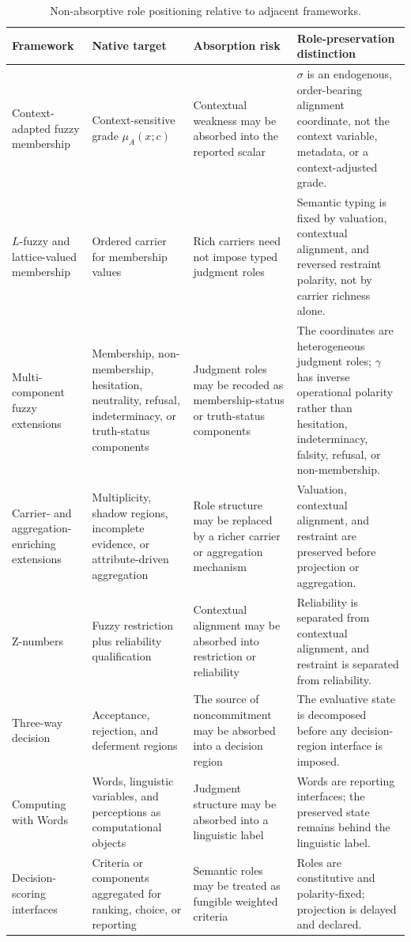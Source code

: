 \documentclass[reqno,final]{amsart}
\theoremstyle{definition}
\theoremstyle{plain}
\theoremstyle{remark}
\begin{document}
\begin{table}[!htbp]
\centering
\caption{Non-absorptive role positioning relative to adjacent frameworks.}
\label{tab:ala_positioning}
\fontsize{10}{12}\selectfont
\setlength{\tabcolsep}{2.4pt}
\renewcommand{\arraystretch}{1.16}
\begin{tabularx}{\textwidth}{@{}>{\raggedright\arraybackslash}p{}
>{\raggedright\arraybackslash}p{}
>{\raggedright\arraybackslash}p{}
>{\raggedright\arraybackslash}X@{}}
\toprule
\textbf{Framework} &
\textbf{Native target} &
\textbf{Absorption risk} &
\textbf{Role-preservation distinction} \\
\midrule
Context-adapted fuzzy membership & Context-sensitive grade \(\mu_A(x;c)\) & Contextual weakness may be absorbed into the reported scalar & \(\sigma\) is an endogenous, order-bearing alignment coordinate, not the context variable, metadata, or a context-adjusted grade. \\
\(L\)-fuzzy and lattice-valued membership & Ordered carrier for membership values & Rich carriers need not impose typed judgment roles & Semantic typing is fixed by valuation, contextual alignment, and reversed restraint polarity, not by carrier richness alone. \\
Multi-component fuzzy extensions & Membership, non-membership, hesitation, neutrality, refusal, indeterminacy, or truth-status components & Judgment roles may be recoded as membership-status or truth-status components & The coordinates are heterogeneous judgment roles; \(\gamma\) has inverse operational polarity rather than hesitation, indeterminacy, falsity, refusal, or non-membership. \\
Carrier- and aggregation-enriching extensions & Multiplicity, shadow regions, incomplete evidence, or attribute-driven aggregation & Role structure may be replaced by a richer carrier or aggregation mechanism & Valuation, contextual alignment, and restraint are preserved before projection or aggregation. \\
Z-numbers & Fuzzy restriction plus reliability qualification & Contextual alignment may be absorbed into restriction or reliability & Reliability is separated from contextual alignment, and restraint is separated from reliability. \\
Three-way decision & Acceptance, rejection, and deferment regions & The source of noncommitment may be absorbed into a decision region & The evaluative state is decomposed before any decision-region interface is imposed. \\
Computing with Words & Words, linguistic variables, and perceptions as computational objects & Judgment structure may be absorbed into a linguistic label & Words are reporting interfaces; the preserved state remains behind the linguistic label. \\
Decision-scoring interfaces & Criteria or components aggregated for ranking, choice, or reporting & Semantic roles may be treated as fungible weighted criteria & Roles are constitutive and polarity-fixed; projection is delayed and declared. \\
\bottomrule
\end{tabularx}
\end{table}
\end{document}
